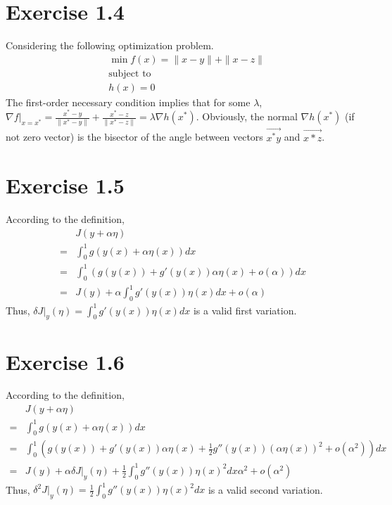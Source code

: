 \documentclass[11pt]{report}
\begin{document}
\section*{Exercise 1.4}
Considering the following optimization problem.
\begin{align*}
&\min f(x) = \|x-y\| + \|x-z\|\\
&\text{subject to}\\
&h(x) = 0
\end{align*}
The first-order necessary condition implies that for some $\lambda$, $\nabla f|_{x=x^*} = \frac{x^* - y}{\|x^*-y\|} + \frac{x^* - z}{\|x^*-z\|} = \lambda \nabla h(x^*)$. Obviously, the normal $\nabla h(x^*)$ (if not zero vector) is the bisector of the angle between vectors $\overrightarrow{x^*y}$ and $\overrightarrow{x*z}$.

\section*{Exercise 1.5}
According to the definition,
\begin{align*}
&J(y + \alpha \eta)\\
=&\int_{0}^{1}g(y(x)+\alpha \eta(x))dx\\
=&\int_{0}^{1}\left(g(y(x)) + g'(y(x)) \alpha \eta(x) + o(\alpha)\right)dx\\
=&J(y) + \alpha \int_{0}^{1} g'(y(x))\eta(x) dx + o(\alpha)
\end{align*}
Thus, $\delta J|_y(\eta) = \int_{0}^{1} g'(y(x))\eta(x) dx$ is a valid first variation.
\section*{Exercise 1.6}
According to the definition,
\begin{align*}
&J(y + \alpha \eta)\\
=&\int_{0}^{1}g(y(x)+\alpha \eta(x))dx\\
=&\int_{0}^{1}\left(g(y(x)) + g'(y(x)) \alpha \eta(x) + \frac{1}{2}g''(y(x)) (\alpha \eta(x))^2 + o(\alpha^2)\right)dx\\
=&J(y) + \alpha \delta J|_y(\eta) + \frac{1}{2}\int_{0}^{1}g''(y(x)) \eta(x)^2 dx \alpha^2 + o(\alpha^2)
\end{align*}
\noindent Thus, $\delta^2 J|_y(\eta) = \frac{1}{2}\int_{0}^{1}g''(y(x)) \eta(x)^2 dx$ is a valid second variation.
\end{document}
